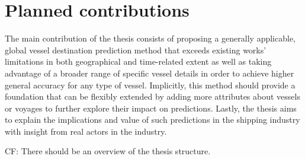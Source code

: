 \section{Planned contributions}

The main contribution of the thesis consists of proposing a generally applicable, global vessel destination prediction method that exceeds existing works' limitations in both geographical and time-related extent as well as taking advantage of a broader range of specific vessel details in order to achieve higher general accuracy for any type of vessel. Implicitly, this method should provide a foundation that can be flexibly extended by adding more attributes about vessels or voyages to further explore their impact on predictions. Lastly, the thesis aims to explain the implications and value of such predictions in the shipping industry with insight from real actors in the industry.


CF: There should be an overview of the thesis structure.
